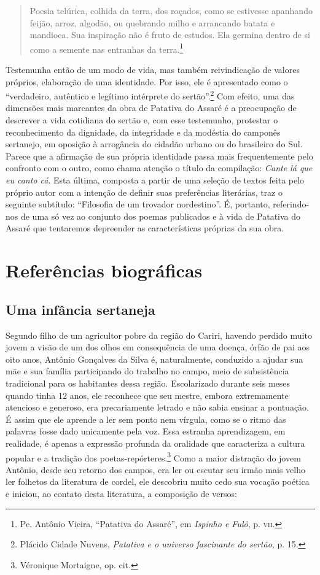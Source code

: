 \begin{quote}
Poesia telúrica, colhida da
terra, dos roçados, como se estivesse apanhando feijão, arroz, algodão, ou
quebrando milho e arrancando batata e mandioca. Sua inspiração não é fruto de
estudos. Ela germina dentro de si como a semente nas entranhas da
terra.\footnote{ Pe. Antônio Vieira, “Patativa do Assaré”, em \textit{Ispinho e
Fulô}, p. \textsc{vii}.}
\end{quote}

Testemunha então de um modo de vida, mas também reivindicação de valores
próprios, elaboração de uma identidade. Por isso, ele é apresentado como o
“verdadeiro, autêntico e legítimo intérprete do sertão”.\footnote{ Plácido Cidade
Nuvens, \textit{Patativa e o universo fascinante do sertão}, p. 15.} Com
efeito, uma das dimensões mais marcantes da obra de Patativa do Assaré é a
preocupação de descrever a vida cotidiana do sertão e, com esse testemunho,
protestar o reconhecimento da dignidade, da integridade e da modéstia do
camponês sertanejo, em oposição à arrogância do cidadão urbano ou do brasileiro
do Sul. Parece que a afirmação de sua própria identidade passa mais
frequentemente pelo confronto com o outro, como chama atenção o título da
compilação: \textit{Cante lá que eu canto cá}. Esta última, composta a partir de uma
seleção de textos feita pelo próprio autor com a intenção de definir suas
preferências literárias, traz o seguinte subtítulo: ``Filosofia de um trovador
nordestino''. É, portanto, referindo-nos de uma só vez ao conjunto dos poemas
publicados e à vida de Patativa do Assaré que tentaremos depreender as
características próprias da sua obra.

\section{Referências biográficas}

\subsection{Uma infância sertaneja}

Segundo filho de um agricultor pobre da região do Cariri, havendo perdido muito
jovem a visão de um dos olhos em consequência de uma doença, órfão de pai aos
oito anos, Antônio Gonçalves da Silva é, naturalmente, conduzido a ajudar sua
mãe e sua família participando do trabalho no campo, meio de subsistência
tradicional para os habitantes dessa região. Escolarizado durante seis meses
quando tinha 12 anos, ele reconhece que seu mestre, embora extremamente
atencioso e generoso, era precariamente letrado e não sabia ensinar a pontuação.
É assim que ele aprende a ler sem ponto nem vírgula, como se o ritmo das
palavras fosse dado unicamente pela voz. Essa estranha aprendizagem, em
realidade, é apenas a expressão profunda da oralidade que caracteriza a cultura
popular e a tradição dos poetas-repórteres.\footnote{ Véronique Mortaigne, op.
cit.} Como a maior distração do jovem Antônio, desde seu retorno dos campos,
era ler ou escutar seu irmão mais velho ler folhetos da literatura de cordel,
ele descobriu muito cedo sua vocação poética e iniciou, ao contato desta
literatura, a composição de versos:

